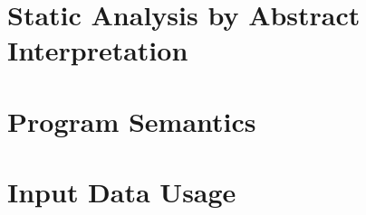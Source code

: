 
\chapter{Static Analysis by Abstract Interpretation}

\chapter{Program Semantics}

\chapter{Input Data Usage}
